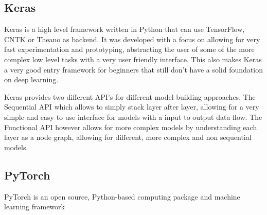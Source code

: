 
\subsection{Keras}
Keras is a high level framework written in Python that can use TensorFlow, CNTK or Theano as backend. It was developed with a focus on allowing for very fast experimentation and prototyping, abstracting the user of some of the more complex low level tasks with a very user friendly interface. This also makes Keras a very good entry framework for beginners that still don't have a solid foundation on deep learning.

Keras provides two different API's for different model building approaches. The Sequential API which allows to simply stack layer after layer, allowing for a very simple and easy to use interface for models with a input to output data flow. The Functional API however allows for more complex models by understanding each layer as a node graph, allowing for different, more complex and non sequential models.
 
\subsection{PyTorch}
PyTorch is an open source, Python-based computing package and machine learning framework 